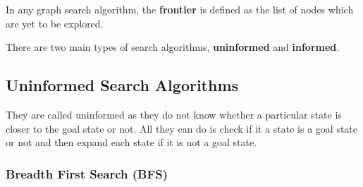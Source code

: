 \documentclass{article}
\theoremstyle{plain}
\theoremstyle{definition}
\begin{document}
In any graph search algorithm, the \textbf{frontier} is defined as the list of nodes which are yet to be explored. 

There are two main types of search algorithms, \textbf{uninformed} and \textbf{informed}.

\subsection{Uninformed Search Algorithms}

They are called uninformed as they do not know whether a particular state is closer to the goal state or not. All they can do is check if it a state is a goal state or not and then expand each state if it is not a goal state. 

\subsubsection{Breadth First Search (BFS)}
\end{document}
